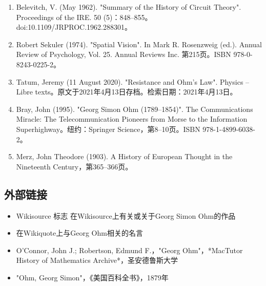 \begin{enumerate}
\item Belevitch, V. (May 1962). "Summary of the History of Circuit Theory". Proceedings of the IRE. 50 (5)：848–855。doi:10.1109/JRPROC.1962.288301。  
\item Robert Sekuler (1974). "Spatial Vision". In Mark R. Rosenzweig (ed.). Annual Review of Psychology, Vol. 25. Annual Reviews Inc. 第215页。ISBN 978-0-8243-0225-2。  
\item Tatum, Jeremy (11 August 2020). "Resistance and Ohm's Law". Physics – Libre texts。原文于2021年4月13日存档。检索日期：2021年4月13日。  
\item  Bray, John (1995). "Georg Simon Ohm (1789–1854)". The Communications Miracle: The Telecommunication Pioneers from Morse to the Information Superhighway。纽约：Springer Science，第8–10页。ISBN 978-1-4899-6038-2。  
\item Merz, John Theodore (1903). A History of European Thought in the Nineteenth Century，第365–366页。
\end{enumerate}
\subsection{外部链接}
\begin{itemize}
\item Wikisource 标志  在Wikisource上有关或关于Georg Simon Ohm的作品  
\item 在Wikiquote上与Georg Ohm相关的名言  
\item O'Connor, John J.; Robertson, Edmund F.，"Georg Ohm"，*MacTutor History of Mathematics Archive*，圣安德鲁斯大学  
\item "Ohm, Georg Simon"，《美国百科全书》，1879年
\end{itemize}
